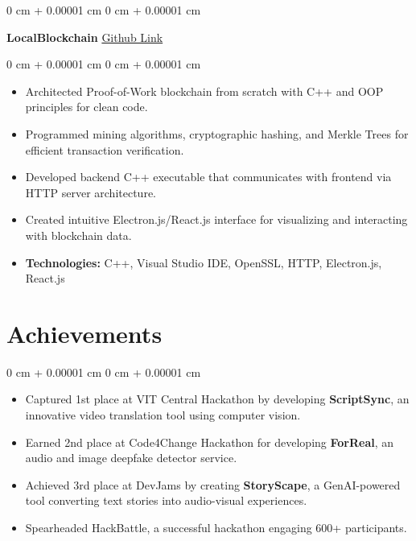 \documentclass[10pt, letterpaper]{article}
\newenvironment{highlights}{
    \begin{itemize}[
        topsep=0.10 cm,
        parsep=0.10 cm,
        partopsep=0pt,
        itemsep=0pt,
        leftmargin=0 cm + 10pt
    ]
}{
    \end{itemize}
}
\newenvironment{onecolentry}{
    \begin{adjustwidth}{
        0 cm + 0.00001 cm
    }{
        0 cm + 0.00001 cm
    }
}{
    \end{adjustwidth}
}
\newenvironment{twocolentry}[2][]{
    \onecolentry
    \def\secondColumn{#2}
    \setcolumnwidth{\fill, 4.5 cm}
    \begin{paracol}{2}
}{
    \switchcolumn \raggedleft \secondColumn
    \end{paracol}
    \endonecolentry
}
\begin{document}
        \vspace{0.2 cm}

        \begin{twocolentry}{
            \href{https://github.com/anshmehta7x/SimpleBlockchain}{Github Link}
        }
            \textbf{LocalBlockchain}\end{twocolentry}

        \vspace{0.10 cm}
        \begin{onecolentry}
            \begin{highlights}
                \item Architected Proof-of-Work blockchain from scratch with C++ and OOP principles for clean code.
                \item Programmed mining algorithms, cryptographic hashing, and Merkle Trees for efficient transaction verification.
                \item Developed backend C++ executable that communicates with frontend via HTTP server architecture.
                \item Created intuitive Electron.js/React.js interface for visualizing and interacting with blockchain data.
                \item \textbf{Technologies:} C++, Visual Studio IDE, OpenSSL, HTTP, Electron.js, React.js
           \end{highlights}
        \end{onecolentry}

\section{Achievements}

    \begin{onecolentry}
        \begin{highlights}
            \item Captured 1st place at VIT Central Hackathon by developing \textbf{ScriptSync}, an innovative video translation tool using computer vision.
            \item Earned 2nd place at Code4Change Hackathon for developing \textbf{ForReal}, an audio and image deepfake detector service.
            \item Achieved 3rd place at DevJams by creating \textbf{StoryScape}, a GenAI-powered tool converting text stories into audio-visual experiences.
            \item Spearheaded HackBattle, a successful hackathon engaging 600+ participants.
        \end{highlights}
    \end{onecolentry}
\end{document}
